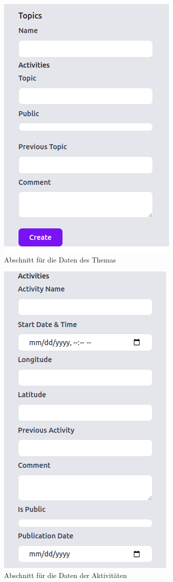 \begin{figure}[h]
    \centering
    \includegraphics[scale=0.35]{pics/add-topic.png}
    \caption{Abschnitt für die Daten des Themas}
    \label{lst:topic}
\end{figure}

\begin{figure}[h]
    \centering
    \includegraphics[scale=0.35]{pics/add-activites.png}
    \caption{Abschnitt für die Daten der Aktivitäten}
    \label{lst:activity}
\end{figure}

